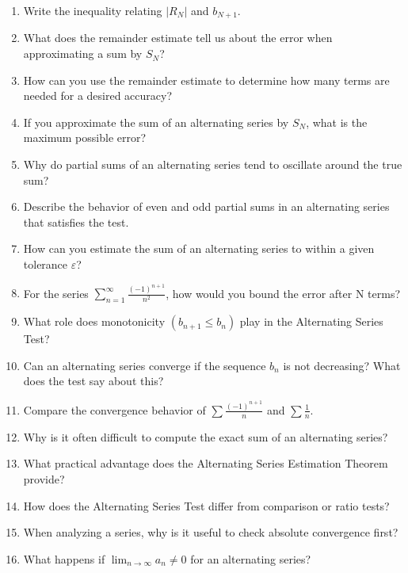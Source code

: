 \begin{enumerate}
  \item Write the inequality relating $|R_N|$ and $b_{N+1}$.
  \item What does the remainder estimate tell us about the error when approximating a sum by $S_N$?
  \item How can you use the remainder estimate to determine how many terms are needed for a desired accuracy?
  \item If you approximate the sum of an alternating series by $S_N$, what is the maximum possible error?
  \item Why do partial sums of an alternating series tend to oscillate around the true sum?
  \item Describe the behavior of even and odd partial sums in an alternating series that satisfies the test.
  \item How can you estimate the sum of an alternating series to within a given tolerance $\varepsilon$?
  \item For the series $\sum_{n=1}^{\infty} \frac{(-1)^{n+1}}{n^2}$, how would you bound the error after N terms?
  \item What role does monotonicity $(b_{n+1} \le b_n)$ play in the Alternating Series Test?
  \item Can an alternating series converge if the sequence $b_n$ is not decreasing? What does the test say about this?
  \item Compare the convergence behavior of $\sum \frac{(-1)^{n+1}}{n}$ and $\sum \frac{1}{n}$.
  \item Why is it often difficult to compute the exact sum of an alternating series?
  \item What practical advantage does the Alternating Series Estimation Theorem provide?
  \item How does the Alternating Series Test differ from comparison or ratio tests?
  \item When analyzing a series, why is it useful to check absolute convergence first?
  \item What happens if $\lim_{n \to \infty} a_n \neq 0$ for an alternating series?
\end{enumerate}
